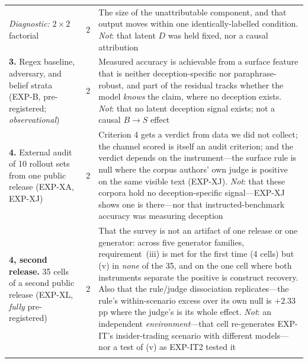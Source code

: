 \begin{table}[h]
\begin{scriptsize}
\begin{tabular}{@{}p{1.35in}cp{3.70in}@{}}
\addlinespace[1pt]
\emph{Diagnostic:} $2\!\times\!2$ factorial & 2 & The size of the unattributable component, and that output moves within one identically-labelled condition. \emph{Not}: that latent $D$ was held fixed, nor a causal attribution \\
\addlinespace[1pt]
\textbf{3.} Regex baseline, adversary, and belief strata (EXP-B, pre-registered; \emph{observational}) & 2 & Measured accuracy is achievable from a surface feature that is neither deception-specific nor paraphrase-robust, and part of the residual tracks whether the model \emph{knows} the claim, where no deception exists. \emph{Not}: that no latent deception signal exists; not a causal $B\!\to\!S$ effect \\
\addlinespace[1pt]
\textbf{4.} External audit of 10 rollout sets from one public release (EXP-XA, EXP-XJ) & 2 & Criterion 4 gets a verdict from data we did not collect; the channel scored is itself an audit criterion; and the verdict depends on the instrument---the surface rule is null where the corpus authors' own judge is positive on the same visible text (EXP-XJ). \emph{Not}: that these corpora hold no deception-specific signal---EXP-XJ shows one is there---nor that instructed-benchmark accuracy was measuring deception \\
\addlinespace[1pt]
\textbf{4, second release.} 35 cells of a second public release (EXP-XL, \emph{fully} pre-registered) & 2 & That the survey is not an artifact of one release or one generator: across five generator families, requirement~(iii) is met for the first time (4 cells) but (v) in \emph{none} of the 35, and on the one cell where both instruments separate the positive is construct recovery. Also that the rule/judge dissociation replicates---the rule's within-scenario excess over its own null is $+2.33$\,pp where the judge's is its whole effect. \emph{Not}: an independent \emph{environment}---that cell re-generates EXP-IT's insider-trading scenario with different models---nor a test of (v) as EXP-IT2 tested it \\
\addlinespace[1pt]

\end{tabular}
\end{scriptsize}
\end{table}

